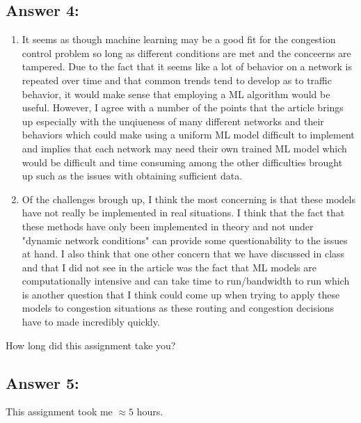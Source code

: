 \documentclass[10pt]{article}
\newenvironment{problem}[2][Problem]{\begin{trivlist}
\item[\hskip \labelsep {\bfseries #1}\hskip \labelsep {\bfseries #2.}]}{\end{trivlist}}
\begin{document}
\subsection*{Answer 4:}
\begin{enumerate}
    \item It seems as though machine learning may be a good fit for the congestion control problem so long as different conditions are met and the conceerns are tampered. Due to the fact that it seems like a lot of behavior on a network is repeated over time and that common trends tend to develop as to traffic behavior, it would make sense that employing a ML algorithm would be useful. However, I agree with a number of the points that the article brings up especially with the unqiueness of many different networks and their behaviors which could make using a uniform ML model difficult to implement and implies that each network may need their own trained ML model which would be difficult and time consuming among the other difficulties brought up such as the issues with obtaining sufficient data.
    \item Of the challenges brough up, I think the most concerning is that these models have not really be implemented in real situations. I think that the fact that these methods have only been implemented in theory and not under "dynamic network conditions" can provide some questionability to the issues at hand. I also think that one other concern that we have discussed in class and that I did not see in the article was the fact that ML models are computationally intensive and can take time to run/bandwidth to run which is another question that I think could come up when trying to apply these models to congestion situations as these routing and congestion decisions have to made incredibly quickly.
\end{enumerate}

\begin{problem}{5}
How long did this assignment take you?
\end{problem}
\subsection*{Answer 5:}
This assignment took me $\approx 5$ hours.
\end{document}
